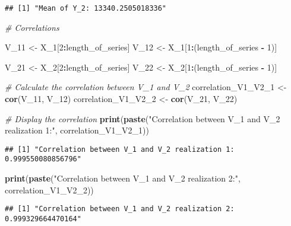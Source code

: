 \documentclass[
]{article}
\newenvironment{Shaded}{\begin{snugshade}}{\end{snugshade}}
\newcommand{\CommentTok}[1]{\textcolor[rgb]{0.56,0.35,0.01}{\textit{#1}}}
\newcommand{\DecValTok}[1]{\textcolor[rgb]{0.00,0.00,0.81}{#1}}
\newcommand{\FunctionTok}[1]{\textcolor[rgb]{0.13,0.29,0.53}{\textbf{#1}}}
\newcommand{\NormalTok}[1]{#1}
\newcommand{\OtherTok}[1]{\textcolor[rgb]{0.56,0.35,0.01}{#1}}
\newcommand{\SpecialCharTok}[1]{\textcolor[rgb]{0.81,0.36,0.00}{\textbf{#1}}}
\newcommand{\StringTok}[1]{\textcolor[rgb]{0.31,0.60,0.02}{#1}}
\begin{document}
\begin{verbatim}
## [1] "Mean of Y_2: 13340.2505018336"
\end{verbatim}

\begin{Shaded}
\begin{Highlighting}[]
\CommentTok{\# Correlations}

\NormalTok{V\_11 }\OtherTok{\textless{}{-}}\NormalTok{ X\_1[}\DecValTok{2}\SpecialCharTok{:}\NormalTok{length\_of\_series]}
\NormalTok{V\_12 }\OtherTok{\textless{}{-}}\NormalTok{ X\_1[}\DecValTok{1}\SpecialCharTok{:}\NormalTok{(length\_of\_series }\SpecialCharTok{{-}} \DecValTok{1}\NormalTok{)]}

\NormalTok{V\_21 }\OtherTok{\textless{}{-}}\NormalTok{ X\_2[}\DecValTok{2}\SpecialCharTok{:}\NormalTok{length\_of\_series]}
\NormalTok{V\_22 }\OtherTok{\textless{}{-}}\NormalTok{ X\_2[}\DecValTok{1}\SpecialCharTok{:}\NormalTok{(length\_of\_series }\SpecialCharTok{{-}} \DecValTok{1}\NormalTok{)]}

\CommentTok{\# Calculate the correlation between V\_1 and V\_2}
\NormalTok{correlation\_V1\_V2\_1 }\OtherTok{\textless{}{-}} \FunctionTok{cor}\NormalTok{(V\_11, V\_12)}
\NormalTok{correlation\_V1\_V2\_2 }\OtherTok{\textless{}{-}} \FunctionTok{cor}\NormalTok{(V\_21, V\_22)}

\CommentTok{\# Display the correlation}
\FunctionTok{print}\NormalTok{(}\FunctionTok{paste}\NormalTok{(}\StringTok{"Correlation between V\_1 and V\_2 realization 1:"}\NormalTok{, correlation\_V1\_V2\_1))}
\end{Highlighting}
\end{Shaded}

\begin{verbatim}
## [1] "Correlation between V_1 and V_2 realization 1: 0.999550080856796"
\end{verbatim}

\begin{Shaded}
\begin{Highlighting}[]
\FunctionTok{print}\NormalTok{(}\FunctionTok{paste}\NormalTok{(}\StringTok{"Correlation between V\_1 and V\_2 realization 2:"}\NormalTok{, correlation\_V1\_V2\_2))}
\end{Highlighting}
\end{Shaded}

\begin{verbatim}
## [1] "Correlation between V_1 and V_2 realization 2: 0.999329664470164"
\end{verbatim}
\end{document}
